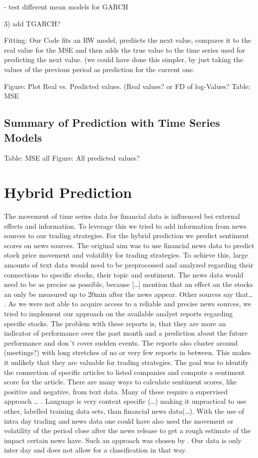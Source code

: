 - test different mean models for GARCH

3) add TGARCH?






Fitting: 
Our Code fits an RW model, prediicts the next value, compares it to the real value for the MSE and then adds the true value to the time series used for predicting the next value. (we could have done this simpler, by just taking the values of the previous period as prediction for the current one. 

Figure: Plot Real vs. Predicted values. (Real values? or FD of log-Values?
Table: MSE





\subsection{Summary of Prediction with Time Series Models}
Table: MSE all
Figure: All predicted values?


\section{Hybrid Prediction}

The movement of time series data for financial data is influenced bei external effects and information. To leverage this we tried to add information from news sources to our trading strategies. For the hybrid prediction we predict sentiment scores on news sources. The original aim was to use financial news data to predict stock price movement and volatility for trading strategies. To achieve this, large amounts of text data would need to be preprocessed and analyzed regarding their connections to specific stocks, their topic and sentiment. The news data would need to be as precise as possible, because […] mention that an effect on the stocks an only be measured up to 20min after the news appear. Other sources say that… .
%
As we were not able to acquire access to a reliable and precise news sources, we tried to implement our approach on the available analyst reports regarding specific stocks. The problem with these reports is, that they are more an indicator of performance over the past month and a prediction about the future performance and don´t cover sudden events. The reports also cluster around (meetings?) with long stretches of no or very few reports in between. This makes it unlikely that they are valuable for trading strategies.
%
The goal was to identify the connection of specific articles to listed companies and compute a sentiment score for the article. There are many ways to calculate sentiment scores, like positive and negative, from text data. Many of these require a supervised approach … . Language is very context specific (…) making it unpractical to use other, labelled training data sets, than financial news data(…). With the use of intra day trading and news data one could have also used the movement or volatility of the period close after the news release to get a rough estimate of the impact certain news have. Such an approach was chosen by \citet{robertson2007news}. Our data is only inter day and does not allow for a classification in that way. 

